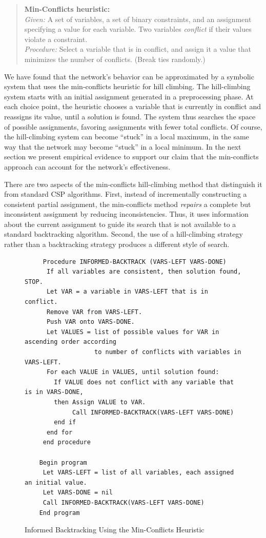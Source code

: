 \documentclass[twoside,12pt,titlepage,a4paper]{article}
\begin{document}
{\small
\begin{quote}
{\bf Min-Conflicts heuristic:}\\
{\em Given:} A set of variables, a set of binary constraints, 
and an assignment specifying a value for each variable. 
Two variables {\em conflict} if their values violate a constraint.\\
{\em Procedure:} Select a variable that is in conflict,
and assign it a value that minimizes the number of conflicts.
(Break ties randomly.)
\end{quote}
}

We have found that the network's behavior can be approximated by a
symbolic system that uses the min-conflicts heuristic for
hill climbing.  The hill-climbing system starts with an initial
assignment generated in a preprocessing phase.  At each choice point,
the heuristic chooses a variable that is currently in conflict and
reassigns its value, until a solution is found. The system thus
searches the space of possible assignments, favoring assignments with
fewer total conflicts.  Of course, the hill-climbing system can become
``stuck'' in a local maximum, in the same way that the network may
become ``stuck'' in a local minimum.  In the next section we present
empirical evidence to support our claim that the min-conflicts
approach can account for the network's effectiveness.

   There are two aspects of the min-conflicts hill-climbing method
that distinguish it from standard CSP algorithms.
First, instead of incrementally constructing a consistent partial
assignment, the min-conflicts method {\em repairs} a complete but
inconsistent assignment by reducing inconsistencies.  Thus, it uses
information about the current assignment to guide its search that is
not available to a standard backtracking algorithm. Second,
the use of a hill-climbing strategy rather than a backtracking strategy
produces a different style of search.

\begin{figure}
{\small
{\bf
\begin{verbatim}
     Procedure INFORMED-BACKTRACK (VARS-LEFT VARS-DONE)
      If all variables are consistent, then solution found, STOP.
      Let VAR = a variable in VARS-LEFT that is in conflict.
      Remove VAR from VARS-LEFT.
      Push VAR onto VARS-DONE.
      Let VALUES = list of possible values for VAR in ascending order according 
                   to number of conflicts with variables in VARS-LEFT.
      For each VALUE in VALUES, until solution found:
        If VALUE does not conflict with any variable that is in VARS-DONE, 
        then Assign VALUE to VAR.
             Call INFORMED-BACKTRACK(VARS-LEFT VARS-DONE)
        end if
      end for
     end procedure
    
    Begin program
     Let VARS-LEFT = list of all variables, each assigned an initial value.
     Let VARS-DONE = nil
     Call INFORMED-BACKTRACK(VARS-LEFT VARS-DONE)
    End program
    \end{verbatim}
}
}
\caption{Informed Backtracking Using the Min-Conflicts Heuristic}
\label{iback}
\end{figure}
\end{document}
